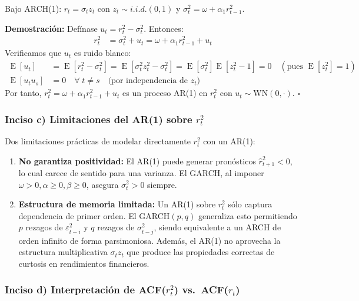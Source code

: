 \documentclass[12pt,a4paper]{article}
\DeclareMathOperator{\E}{E}
\begin{document}
\begin{solucion}
Bajo ARCH(1): $r_t = \sigma_t z_t$ con $z_t\sim i.i.d.(0,1)$ y $\sigma_t^2=\omega+\alpha_1 r_{t-1}^2$.

\textbf{Demostración:} Defínase $u_t = r_t^2 - \sigma_t^2$. Entonces:
\begin{align*}
r_t^2 &= \sigma_t^2 + u_t = \omega + \alpha_1 r_{t-1}^2 + u_t
\end{align*}
Verificamos que $u_t$ es ruido blanco:
\begin{align*}
\E[u_t] &= \E[r_t^2 - \sigma_t^2] = \E[\sigma_t^2 z_t^2 - \sigma_t^2] = \E[\sigma_t^2]\E[z_t^2-1] = 0 \quad (\text{pues }\E[z_t^2]=1)\\
\E[u_t u_s] &= 0 \quad \forall\;t\neq s \quad \text{(por independencia de }z_t\text{)}
\end{align*}
Por tanto, $r_t^2 = \omega + \alpha_1 r_{t-1}^2 + u_t$ es un proceso AR(1) en $r_t^2$ con $u_t\sim\mathrm{WN}(0,\cdot)$. \hfill$\square$
\end{solucion}

\subsubsection*{Inciso c) Limitaciones del AR(1) sobre $r_t^2$}

\begin{solucion}
Dos limitaciones prácticas de modelar directamente $r_t^2$ con un AR(1):
\begin{enumerate}[noitemsep]
  \item \textbf{No garantiza positividad:} El AR(1) puede generar pronósticos $\hat{r}_{t+1}^2<0$, lo cual carece de sentido para una varianza. El GARCH, al imponer $\omega>0,\alpha\geq0,\beta\geq0$, asegura $\sigma_t^2>0$ siempre.
  \item \textbf{Estructura de memoria limitada:} Un AR(1) sobre $r_t^2$ sólo captura dependencia de primer orden. El GARCH$(p,q)$ generaliza esto permitiendo $p$ rezagos de $\varepsilon_{t-i}^2$ y $q$ rezagos de $\sigma_{t-j}^2$, siendo equivalente a un ARCH de orden infinito de forma parsimoniosa. Además, el AR(1) no aprovecha la estructura multiplicativa $\sigma_t z_t$ que produce las propiedades correctas de curtosis en rendimientos financieros.
\end{enumerate}
\end{solucion}

\subsubsection*{Inciso d) Interpretación de ACF($r_t^2$) vs.\ ACF($r_t$)}
\end{document}
